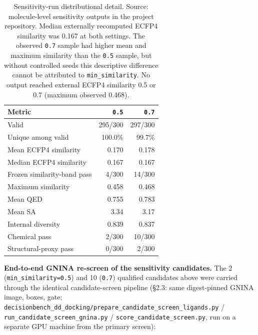 \documentclass{article}
\begin{document}
\begin{table}[h]
\centering
\footnotesize
\begin{tabular}{lrr}
\toprule
Metric & \texttt{0.5} & \texttt{0.7} \\
\midrule
Valid & 295/300 & 297/300 \\
Unique among valid & 100.0\% & 99.7\% \\
Mean ECFP4 similarity & 0.170 & 0.178 \\
Median ECFP4 similarity & 0.167 & 0.167 \\
Frozen similarity-band pass & 4/300 & 14/300 \\
Maximum similarity & 0.458 & 0.468 \\
Mean QED & 0.755 & 0.783 \\
Mean SA & 3.34 & 3.17 \\
Internal diversity & 0.839 & 0.837 \\
Chemical pass & 2/300 & 10/300 \\
Structural-proxy pass & 0/300 & 2/300 \\
\bottomrule
\end{tabular}
\caption{Sensitivity-run distributional detail. Source: molecule-level sensitivity outputs in the project repository. Median externally recomputed ECFP4 similarity was 0.167 at both settings. The observed \texttt{0.7} sample had higher mean and maximum similarity than the \texttt{0.5} sample, but without controlled seeds this descriptive difference cannot be attributed to \texttt{min\_similarity}. No output reached external ECFP4 similarity 0.5 or 0.7 (maximum observed 0.468).}
\end{table}

\FloatBarrier

\textbf{End-to-end GNINA re-screen of the sensitivity candidates.} The 2 (\texttt{min\_similarity=0.5}) and 10 (\texttt{0.7}) qualified candidates above were carried through the identical candidate-screen pipeline (\S2.3: same digest-pinned GNINA image, boxes, gate; \texttt{decisionbench\_dd\_docking/prepare\_candidate\_screen\_ligands.py} / \texttt{run\_candidate\_screen\_gnina.py} / \texttt{score\_candidate\_screen.py}, run on a separate GPU machine from the primary screen):
\end{document}
